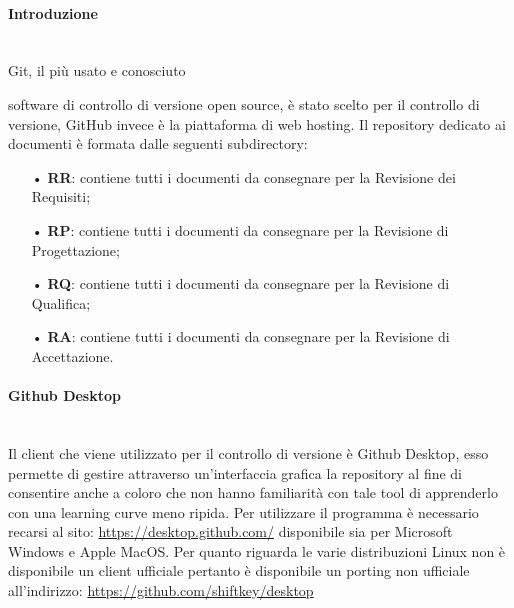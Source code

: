 \paragraph{Introduzione}\mbox{}\\
Git, il più usato e conosciuto {software di controllo di {versione} open source, è stato scelto per il controllo di versione, GitHub invece è la piattaforma di web hosting. 
\newline
Il repository dedicato ai documenti è formata dalle seguenti subdirectory:
\begin{itemize}
\item[•] \textbf{RR}: contiene tutti i documenti da consegnare per la Revisione dei Requisiti;
\item[•] \textbf{RP}: contiene tutti i documenti da consegnare per la Revisione di Progettazione;
\item[•] \textbf{RQ}: contiene tutti i documenti da consegnare per la Revisione di Qualifica;
\item[•] \textbf{RA}: contiene tutti i documenti da consegnare per la Revisione di Accettazione.
\end{itemize}

\paragraph{Github Desktop}\mbox{}\\
Il {client} che viene utilizzato per il controllo di versione è Github Desktop, esso permette di gestire attraverso un'interfaccia grafica la {repository} al fine di consentire anche a coloro che non hanno familiarità con tale tool di apprenderlo con una {learning curve} meno ripida. Per utilizzare il programma è necessario recarsi al sito: \url{https://desktop.github.com/} disponibile sia per {Microsoft Windows} e {Apple MacOS}. Per quanto riguarda le varie {distribuzioni Linux} non è disponibile un client ufficiale pertanto è disponibile un {porting} non ufficiale all'indirizzo: \url{https://github.com/shiftkey/desktop}

}
